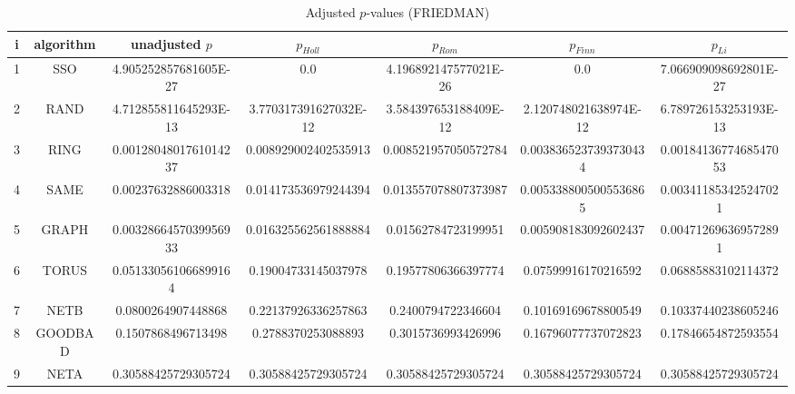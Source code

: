 \documentclass[a4paper,10pt]{article}
\begin{document}
\begin{landscape}
\begin{table}[!htp]
\centering\scriptsize
\caption{Adjusted $p$-values (FRIEDMAN)}
\begin{tabular}{ccccccc}
i&algorithm&unadjusted $p$&$p_{Holl}$&$p_{Rom}$&$p_{Finn}$&$p_{Li}$\\
\hline
1& SSO&4.905252857681605E-27&0.0&4.196892147577021E-26&0.0&7.066909098692801E-27\\
2& RAND&4.712855811645293E-13&3.770317391627032E-12&3.584397653188409E-12&2.120748021638974E-12&6.789726153253193E-13\\
3& RING&0.0012804801761014237&0.008929002402535913&0.008521957050572784&0.0038365237393730434&0.0018413677468547053\\
4& SAME&0.00237632886003318&0.014173536979244394&0.013557078807373987&0.0053388005005536865&0.003411853425247021\\
5& GRAPH&0.0032866457039956933&0.016325562561888884&0.01562784723199951&0.005908183092602437&0.004712696369572891\\
6& TORUS&0.051330561066899164&0.19004733145037978&0.19577806366397774&0.07599916170216592&0.06885883102114372\\
7& NETB&0.0800264907448868&0.22137926336257863&0.2400794722346604&0.10169169678800549&0.10337440238605246\\
8& GOODBAD&0.1507868496713498&0.2788370253088893&0.3015736993426996&0.16796077737072823&0.17846654872593554\\
9& NETA&0.30588425729305724&0.30588425729305724&0.30588425729305724&0.30588425729305724&0.30588425729305724\\
\hline
\end{tabular}
\end{table}


\newpage


\end{landscape}
\end{document}
